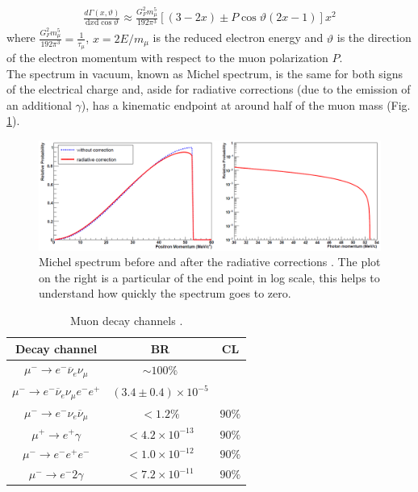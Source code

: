 \documentclass[12pt,a4paper,openright, oneside, titlepage]{book} %
\begin{document}
\begin{align}
\frac{d\Gamma(x,\vartheta)}{\mathrm dx \mathrm d\cos\vartheta}\approx \frac{G_F^2m_\mu^5}{192\pi^3}[(3-2x)\pm P\cos\vartheta(2x-1)]x^2
\label{eq_muon}
\end{align}
where $\frac{G_F^2m_\mu^5}{192\pi^3}=\frac{1}{\tau_\mu}$, $x=2E/m_{\mu}$ is the reduced electron energy and $\vartheta$ is the direction of the electron momentum with respect to the muon polarization $P$.\\
The spectrum in vacuum, known as Michel spectrum, is the same for both signs of the electrical charge and, aside for radiative corrections (due to the emission of an additional $\gamma$), has a kinematic endpoint at around half of the muon mass (Fig. \ref{_Michel}).\\

\begin{figure}[h!]
\centering
\includegraphics[scale=0.5]{Michel}
\caption[Michel spectrum]{Michel spectrum before and after the radiative corrections \cite{Signorelli}. The plot on the right is a particular of the end point in log scale, this helps to understand how quickly the spectrum goes to zero.}
\label{_Michel}
\end{figure}

\begin{table}
\centering
\begin{tabular}{|c|c|c|}
\hline
Decay channel & BR & CL\\
\hline
\hline
$\mu^- \rightarrow e^-\overline{\nu}_e\nu_\mu$&$\sim100\%$&\\
$\mu^- \rightarrow e^-\overline{\nu}_e\nu_\mu e^-e^+$&
$(3.4\pm0.4)\times10^{-5}$&\\
\hline
$\mu^- \rightarrow e^-\nu_e\overline{\nu}_\mu$&$<1.2\%$&$90\%$\\
$\mu^+ \rightarrow e^+\gamma$&$<4.2\times10^{-13}$&$90\%$\\
$\mu^- \rightarrow e^-e^+e^-$&$<1.0\times10^{-12}$&$90\%$\\
$\mu^- \rightarrow e^-2\gamma$&$<7.2\times10^{-11}$&$90\%$\\
\hline
\end{tabular}
\caption[Muon decay channels]{Muon decay channels \cite{PDG}.}
\label{T_mu}
\end{table}
\end{document}
